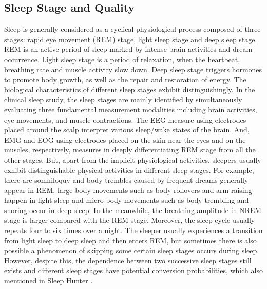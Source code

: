 \subsection{Sleep Stage and Quality}

Sleep is generally considered as a cyclical physiological process composed of three stages: rapid eye movement (REM) stage, light sleep
stage and deep sleep stage. REM is an active period of sleep marked by intense brain activities and dream occurrence. Light sleep stage is
a period of relaxation, when the heartbeat, breathing rate and muscle activity slow down. Deep sleep stage triggers hormones to promote
body growth, as well as the repair and restoration of energy.  The biological characteristics of different sleep stages exhibit
distinguishingly. In the clinical sleep study, the sleep stages are mainly identified by simultaneously evaluating three fundamental
measurement modalities including brain activities, eye movements, and muscle contractions. The EEG measure using electrodes placed around
the scalp interpret various sleep/wake states of the brain. And, EMG and EOG using electrodes placed on the skin near the eyes and on the
muscles, respectively, measures in deeply differentiating REM stage from all the other stages. But, apart from the implicit physiological
activities, sleepers usually exhibit distinguishable physical activities in different sleep stages. For example, there are somniloquy and
body trembles caused by frequent dreams generally appear in REM, large body movements such as body rollovers and arm raising happen in
light sleep and micro-body movements such as body trembling and snoring occur in deep sleep.  In the meanwhile, the breathing amplitude in
NREM stage is larger compared with the REM stage. Moreover, the sleep cycle usually repeats four to six times over a night. The sleeper
usually experiences a transition from light sleep to deep sleep and then enters REM, but sometimes there is also possible a phenomenon of
skipping some certain sleep stages occurs during sleep. However, despite this, the dependence between two successive sleep stages still
exists and different sleep stages have potential conversion probabilities, which also mentioned in Sleep Hunter \cite{gu2016sleep}.


